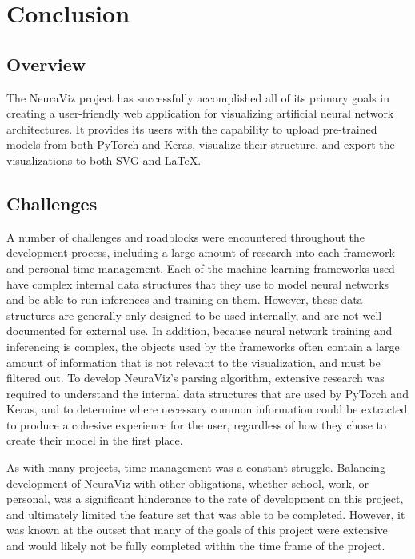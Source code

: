 \section{Conclusion}																	
\label{sec:Conclusion}

\subsection{Overview} 
The NeuraViz project has successfully accomplished all of its primary goals in creating a user-friendly web application for visualizing artificial neural network architectures. It provides its users with the capability to upload pre-trained models from both PyTorch and Keras, visualize their structure, and export the visualizations to both SVG and \LaTeX{}.

\subsection{Challenges}
A number of challenges and roadblocks were encountered throughout the development process, including a large amount of research into each framework and personal time management. Each of the machine learning frameworks used have complex internal data structures that they use to model neural networks and be able to run inferences and training on them. However, these data structures are generally only designed to be used internally, and are not well documented for external use. In addition, because neural network training and inferencing is complex, the objects used by the frameworks often contain a large amount of information that is not relevant to the visualization, and must be filtered out. To develop NeuraViz's parsing algorithm, extensive research was required to understand the internal data structures that are used by PyTorch and Keras, and to determine where necessary common information could be extracted to produce a cohesive experience for the user, regardless of how they chose to create their model in the first place.

As with many projects, time management was a constant struggle. Balancing development of NeuraViz with other obligations, whether school, work, or personal, was a significant hinderance to the rate of development on this project, and ultimately limited the feature set that was able to be completed. However, it was known at the outset that many of the goals of this project were extensive and would likely not be fully completed within the time frame of the project.

